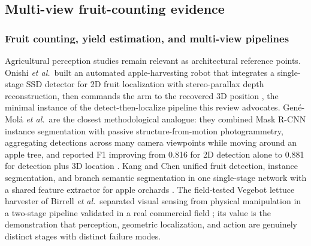 \subsection{Multi-view fruit-counting evidence}

\subsubsection{Fruit counting, yield estimation, and multi-view pipelines}

Agricultural perception studies remain relevant as architectural reference points. Onishi \textit{et al.}\ built an automated apple-harvesting robot that integrates a single-stage SSD detector for 2D fruit localization with stereo-parallax depth reconstruction, then commands the arm to the recovered 3D position \cite{onishi2019harvest}, the minimal instance of the detect-then-localize pipeline this review advocates. Gené-Molá \textit{et al.}\ are the closest methodological analogue: they combined Mask R-CNN instance segmentation with passive structure-from-motion photogrammetry, aggregating detections across many camera viewpoints while moving around an apple tree, and reported F1 improving from 0.816 for 2D detection alone to 0.881 for detection plus 3D location \cite{genemola2020fruit3d}. Kang and Chen unified fruit detection, instance segmentation, and branch semantic segmentation in one single-stage network with a shared feature extractor for apple orchards \cite{kang2020strawberry}. The field-tested Vegebot lettuce harvester of Birrell \textit{et al.}\ separated visual sensing from physical manipulation in a two-stage pipeline validated in a real commercial field \cite{birrell2020lettuce}; its value is the demonstration that perception, geometric localization, and action are genuinely distinct stages with distinct failure modes.

